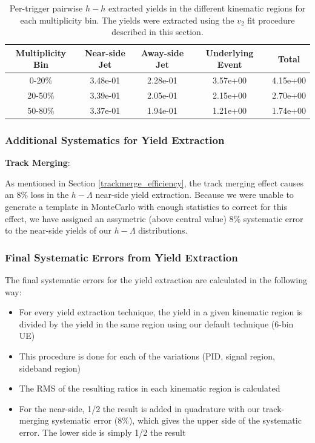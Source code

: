 \documentclass[ALICE,manyauthors]{ALICE_analysis_notes}
\begin{document}
\clearpage

\begin{table}[h!]
\centering
\begin{tabular}{| c | c | c | c | c | }
\hline
Multiplicity Bin & Near-side Jet & Away-side Jet & Underlying Event & Total  \\
\hline

0-20\% & 3.48e-01  & 2.28e-01  & 3.57e+00 & 4.15e+00 \\
20-50\% & 3.39e-01 & 2.05e-01  & 2.15e+00 & 2.70e+00 \\
50-80\% & 3.37e-01 & 1.94e-01  & 1.21e+00 & 1.74e+00 \\

\hline
\end{tabular}
\caption{Per-trigger pairwise $h-h$ extracted yields in the different kinematic regions for each multiplicity bin. The yields were extracted using the $v_{2}$ fit procedure described in this section.}
\label{h_h_yield_table_v2fit}
\end{table}

\subsubsection{Additional Systematics for Yield Extraction}
\textbf{Track Merging}:

As mentioned in Section \ref{trackmerge_efficiency}, the track merging effect causes an 8\% loss in the $h-\Lambda$ near-side yield extraction. Because we were unable to generate a template in MonteCarlo with enough statistics to correct for this effect, we have assigned an assymetric (above central value) 8\% systematic error to the near-side yields of our $h-\Lambda$ distributions.


\subsubsection{Final Systematic Errors from Yield Extraction}
The final systematic errors for the yield extraction are calculated in the following way:
\begin{itemize}
\item For every yield extraction technique, the yield in a given kinematic region is divided by the yield in the same region using our default technique (6-bin UE)
\item This procedure is done for each of the variations (PID, signal region, sideband region)
\item The RMS of the resulting ratios in each kinematic region is calculated
\item For the near-side, 1/2 the result is added in quadrature with our track-merging systematic error (8\%), which gives the upper side of the systematic error. The lower side is simply 1/2 the result
\end{itemize}
\end{document}
